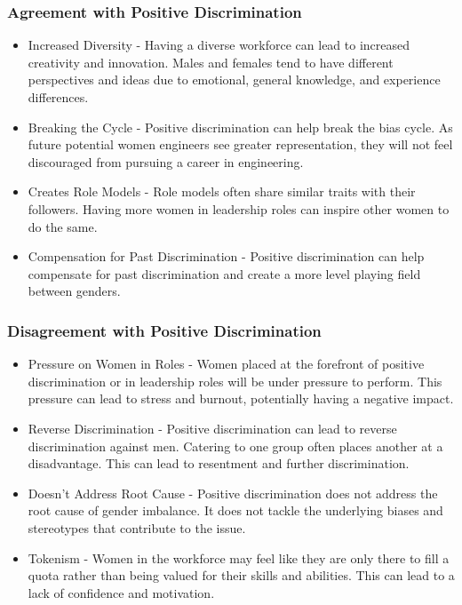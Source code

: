 \documentclass{article}
\begin{document}
\subsubsection{Agreement with Positive Discrimination}
\begin{itemize}
    \item Increased Diversity - Having a diverse workforce can lead to increased creativity and innovation. Males and females tend to have different perspectives and ideas due to emotional, general knowledge, and experience differences.
    \item Breaking the Cycle - Positive discrimination can help break the bias cycle. As future potential women engineers see greater representation, they will not feel discouraged from pursuing a career in engineering.
    \item Creates Role Models - Role models often share similar traits with their followers. Having more women in leadership roles can inspire other women to do the same.
    \item Compensation for Past Discrimination - Positive discrimination can help compensate for past discrimination and create a more level playing field between genders.
\end{itemize}

\subsubsection{Disagreement with Positive Discrimination}
\begin{itemize}
    \item Pressure on Women in Roles - Women placed at the forefront of positive discrimination or in leadership roles will be under pressure to perform. This pressure can lead to stress and burnout, potentially having a negative impact.
    \item Reverse Discrimination - Positive discrimination can lead to reverse discrimination against men. Catering to one group often places another at a disadvantage. This can lead to resentment and further discrimination.
    \item Doesn't Address Root Cause - Positive discrimination does not address the root cause of gender imbalance. It does not tackle the underlying biases and stereotypes that contribute to the issue.
    \item Tokenism - Women in the workforce may feel like they are only there to fill a quota rather than being valued for their skills and abilities. This can lead to a lack of confidence and motivation.
\end{itemize}
\end{document}
